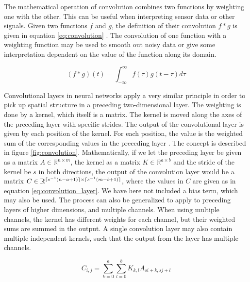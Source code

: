 \documentclass[a4paper]{article}
\DeclarePairedDelimiter{\ceil}{\lceil}{\rceil}
\newcommand{\R}{\mathbb{R}}
\begin{document}
The mathematical operation of convolution combines two functions by weighting one with the other. This can be useful when interpreting sensor data or other signals. Given two functions $f$ and $g$, the definition of their convolution $f*g$ is given in equation \ref{eq:convolution} \cite{FYSSTK4155}. The convolution of one function with a weighting function may be used to smooth out noisy data or give some interpretation dependent on the value of the function along its domain.

\begin{equation}
    \label{eq:convolution}
    (f*g)(t) =
    \int_{-\infty}^{\infty} f(\tau)g(t - \tau) d\tau
\end{equation}

Convolutional layers in neural networks apply a very similar principle in order to pick up spatial structure in a preceding two-dimensional layer. The weighting is done by a kernel, which itself is a matrix. The kernel is moved along the axes of the preceding layer with specific strides. The output of the convolutional layer is given by each position of the kernel. For each position, the value is the weighted sum of the corresponding values in the preceding layer \cite{Geron}. The concept is described in figure \ref{fig:convolution}. Mathematically, if we let the preceding layer be given as a matrix $A \in \R^{n \times m}$, the kernel as a matrix $K \in \R^{a \times b}$ and the stride of the kernel be $s$ in both directions, the output of the convolution layer would be a matrix $C \in \R^{\ceil{s^{-1}(n - a + 1)} \times \ceil{s^{-1}(m - b + 1)}}$, where the values in $C$ are given as in equation \ref{eq:convolution_layer}. We have here not included a bias term, which may also be used. The process can also be generalized to apply to preceding layers of higher dimensions, and multiple channels. When using multiple channels, the kernel has different weights for each channel, but their weighted sums are summed in the output. A single convolution layer may also contain multiple independent kernels, such that the output from the layer has multiple channels.

\begin{equation}
    \label{eq:convolution_layer}
    C_{i,j} = \sum_{k=0}^{a} \sum_{l=0}^{b} K_{k,l} A_{si+k,sj+l}
\end{equation}
\end{document}
